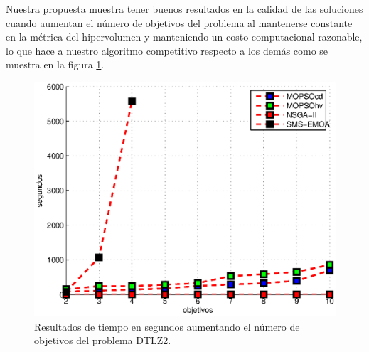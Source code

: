 Nuestra propuesta muestra tener buenos resultados en la
calidad de las soluciones cuando aumentan el n\'umero de objetivos del problema al mantenerse constante en la m\'etrica del 
hipervolumen y manteniendo un costo computacional razonable, lo que hace a nuestro algoritmo competitivo respecto a los dem\'as como se muestra en 
la figura \ref{fig:tescala}.

  \begin{figure}
      \begin{center}
	  \includegraphics[scale=1]{Cap4/tiempoEscala.eps}
      \end{center}
	\caption[Tiempos en escalamiento para el problema DTLZ2.]{Resultados de tiempo en segundos aumentando el n\'umero 
	de objetivos del problema DTLZ2.}
      \label{fig:tescala}
  \end{figure}

 
